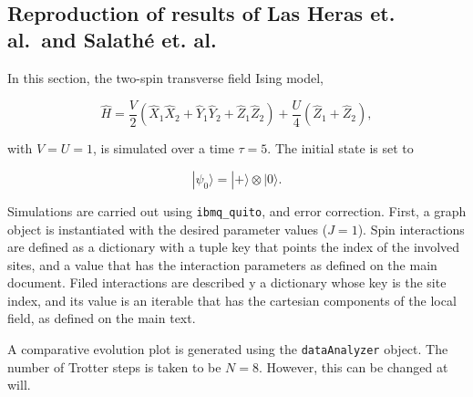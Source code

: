     \begin{center}
    \end{center}
    { \hspace*{\fill} \\}
    
    \hypertarget{reproduction-of-results-of-las-heras-et.-al.-and-salathuxe9-et.-al.}{%
\subsection{Reproduction of results of Las Heras et. al.~and Salathé et.
al.}\label{reproduction-of-results-of-las-heras-et.-al.-and-salathuxe9-et.-al.}}

In this section, the two-spin transverse field Ising model,

\[
\hat{H} = \frac{V}{2}(\hat{X}_1\hat{X}_2 + \hat{Y}_1\hat{Y}_2 + \hat{Z}_1\hat{Z}_2) + \frac{U}{4}(\hat{Z}_1 + \hat{Z}_2),
\]

\noindent with \(V = U = 1\), is simulated over a time \(\tau = 5\). The initial
state is set to

\[
|\psi_0\rangle = |+\rangle\otimes|0\rangle.
\]

Simulations are carried out using \texttt{ibmq\_quito}, and error
correction. First, a graph object is instantiated with the desired
parameter values (\(J=1\)). Spin interactions are defined as a
dictionary with a tuple key that points the index of the involved sites,
and a value that has the interaction parameters as defined on the main
document. Filed interactions are described y a dictionary whose key is
the site index, and its value is an iterable that has the cartesian
components of the local field, as defined on the main text.

    A comparative evolution plot is generated using the
\texttt{dataAnalyzer} object. The number of Trotter steps is taken to be
\(N = 8\). However, this can be changed at will.

